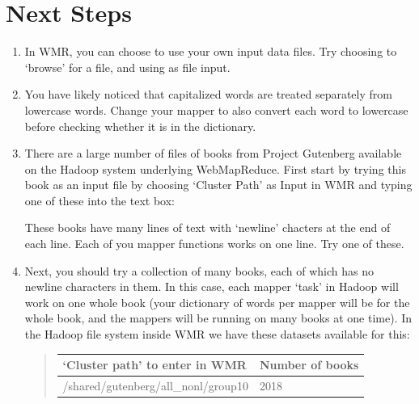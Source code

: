 \documentclass[letterpaper,10pt,openany,oneside]{sphinxmanual}
\begin{document}
\section{Next Steps}
\label{wmr_py/wmr_py:next-steps}\begin{enumerate}
\item {} 
In WMR, you can choose to use your own input data files. Try
choosing to `browse' for a file, and using  as file
input.

\item {} 
You have likely noticed that capitalized words are treated
separately from lowercase words. Change your mapper to also convert
each word to lowercase before checking whether it is in the
dictionary.

\item {} 
There are a large number of files of books from Project
Gutenberg available on the Hadoop system underlying WebMapReduce.
First start by trying this book as an input file by choosing
`Cluster Path' as Input in WMR and typing one of these into the
text box:


These books have many lines of text with `newline' chacters at the
end of each line. Each of you mapper functions works on one line.
Try one of these.

\item {} 
Next, you should try a collection of many books, each of which
has no newline characters in them. In this case, each mapper `task'
in Hadoop will work on one whole book (your dictionary of words per
mapper will be for the whole book, and the mappers will be running
on many books at one time). In the Hadoop file system inside WMR we
have these datasets available for this:
\begin{quote}

\begin{tabulary}{\linewidth}{|L|L|}
\hline
\textbf{
`Cluster path' to enter in WMR
} & \textbf{
Number of books
}\\\hline

/shared/gutenberg/all\_nonl/group10
 & 
2018
\\\hline


\end{tabulary}
\end{quote}
\end{enumerate}
\end{document}
